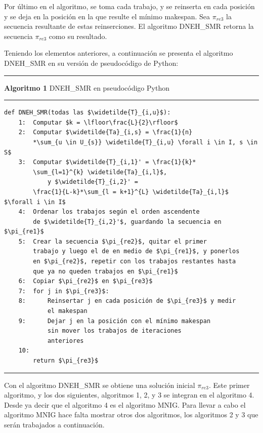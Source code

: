 \documentclass{article}
\begin{document}
\vspace{\baselineskip}
Por último en el algoritmo, se toma cada trabajo, y se reinserta en cada posición y se deja en la posición en la que resulte el mínimo makespan. Sea $\pi_{re3}$ la secuencia resultante de estas reinserciones. El algoritmo DNEH\_SMR retorna la secuencia $\pi_{re3}$ como su resultado. \autocite{algMNIG}

\vspace{\baselineskip}
Teniendo los elementos anteriores, a continuación se presenta el algoritmo DNEH\_SMR en su versión de pseudocódigo de Python:

\pagebreak

\noindent\noindent
\rule{\linewidth}{0.4pt}

\textbf{Algoritmo 1} DNEH\_SMR en pseudocódigo Python

\noindent\noindent
\rule{\linewidth}{0.4pt}
    
\begin{lstlisting}[mathescape=true]
    def DNEH_SMR(todas las $\widetilde{T}_{i,u}$):
    1:  Computar $k = \lfloor\frac{L}{2}\rfloor$
    2:  Computar $\widetilde{Ta}_{i,s} = \frac{1}{n}
        *\sum_{u \in U_{s}} \widetilde{T}_{i,u} \forall i \in I, s \in S$
    3:  Computar $\widetilde{T}_{i,1}' = \frac{1}{k}*
        \sum_{l=1}^{k} \widetilde{Ta}_{i,l}$, 
            y $\widetilde{T}_{i,2}' = 
        \frac{1}{L-k}*\sum_{l = k+1}^{L} \widetilde{Ta}_{i,l}$ $\forall i \in I$
    4:  Ordenar los trabajos según el orden ascendente 
        de $\widetilde{T}_{i,2}'$, guardando la secuencia en $\pi_{re1}$
    5:  Crear la secuencia $\pi_{re2}$, quitar el primer 
        trabajo y luego el de en medio de $\pi_{re1}$, y ponerlos
        en $\pi_{re2}$, repetir con los trabajos restantes hasta
        que ya no queden trabajos en $\pi_{re1}$
    6:  Copiar $\pi_{re2}$ en $\pi_{re3}$
    7:  for j in $\pi_{re3}$:
    8:      Reinsertar j en cada posición de $\pi_{re3}$ y medir
            el makespan
    9:      Dejar j en la posición con el mínimo makespan
            sin mover los trabajos de iteraciones
            anteriores
    10: 
        return $\pi_{re3}$
\end{lstlisting}

\noindent\noindent
\rule{\textwidth}{0.4pt}

\vspace{\baselineskip}
Con el algoritmo DNEH\_SMR se obtiene una solución inicial $\pi_{re3}$. Este primer algoritmo, y los dos siguientes, algoritmos 1, 2, y 3 se integran en el algoritmo 4. Desde ya decir que el algoritmo 4 es el algoritmo MNIG. Para llevar a cabo el algoritmo MNIG hace falta mostrar otros dos algoritmos, los algoritmos 2 y 3 que serán trabajados a continuación.
\end{document}
